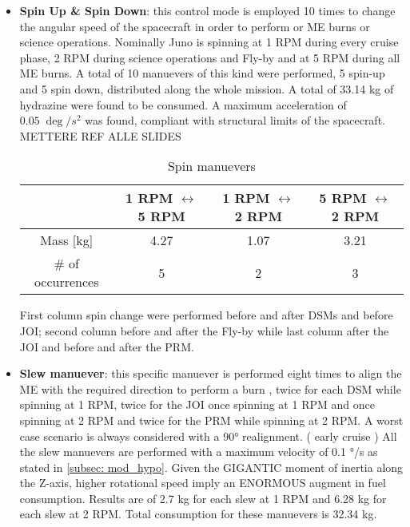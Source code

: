 \begin{itemize}
    \item \textbf{Spin Up \& Spin Down}: this control mode is employed 10 times to change the angular speed of the spacecraft in order to perform or ME burns or science operations. Nominally Juno is spinning at 1 RPM during every cruise phase, 2 RPM during science operations and Fly-by and at 5 RPM during all ME burns. A total of 10 manuevers of this kind were performed, 5 spin-up and 5 spin down, distributed along the whole mission.   A total of 33.14 kg of hydrazine were found to be consumed. A maximum acceleration of $0.05 \; \deg /s^2$ was found, compliant with structural limits of the spacecraft. METTERE REF ALLE SLIDES
    
    \begin{table}[H]
        \renewcommand{\arraystretch}{1.3}
        \centering
        \begin{tabular}{|c|c|c|c|}
            \hline
            &\textbf{1 RPM $\leftrightarrow$ 5 RPM } & \textbf{1 RPM $\leftrightarrow$ 2 RPM } &\textbf{5 RPM $\leftrightarrow$ 2 RPM }\\
            \hline
            \hline
            Mass [kg] & 4.27 & 1.07 & 3.21 \\
            \hline
            \# of occurrences & 5 & 2 & 3 \\
            \hline
        \end{tabular}
        \caption{Spin manuevers}
        \label{table:spin}
    \end{table}

    First column spin change were performed before and after DSMs and before JOI; second column before and after the Fly-by while last column after the JOI and before and after the PRM. 

    \item \textbf{Slew manuever}: this specific manuever is performed eight times to align the ME with the required direction to perform a burn \mref, twice for each DSM while spinning at 1 RPM, twice for the JOI once spinning at 1 RPM and once spinning at 2 RPM and twice for the PRM while spinning at 2 RPM. A worst case scenario is always considered with a 90° realignment. \mref ( early cruise )  
    All the slew manuevers are performed with a maximum velocity of 0.1 °/s as stated in \autoref{subsec: mod_hypo}. 
    Given the GIGANTIC moment of inertia along the Z-axis, higher rotational speed imply an ENORMOUS augment in fuel consumption. Results are of 2.7 kg for each slew at 1 RPM and 6.28 kg for each slew at 2 RPM.  Total consumption for these manuevers is 32.34 kg. 
    

\end{itemize}
